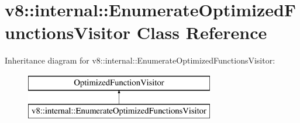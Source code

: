 \hypertarget{classv8_1_1internal_1_1_enumerate_optimized_functions_visitor}{}\section{v8\+:\+:internal\+:\+:Enumerate\+Optimized\+Functions\+Visitor Class Reference}
\label{classv8_1_1internal_1_1_enumerate_optimized_functions_visitor}
Inheritance diagram for v8\+:\+:internal\+:\+:Enumerate\+Optimized\+Functions\+Visitor\+:\begin{figure}[H]
\begin{center}
\leavevmode
\includegraphics[height=2.000000cm]{classv8_1_1internal_1_1_enumerate_optimized_functions_visitor}
\end{center}
\end{figure}
